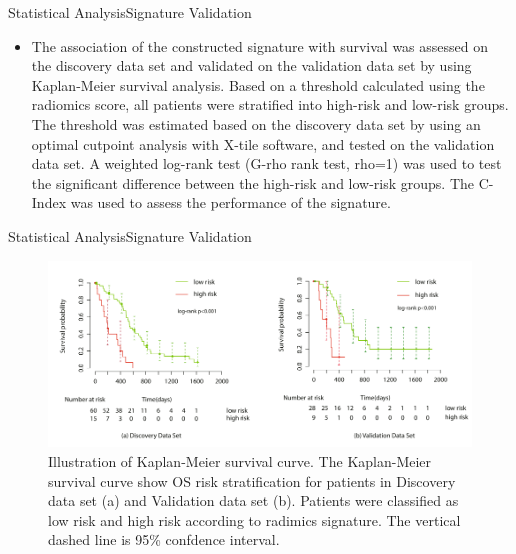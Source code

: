 \documentclass[
]{beamer}
\begin{document}
	\begin{frame}{Statistical Analysis}{Signature Validation}
		\begin{itemize}
			\item The association of the constructed signature with survival was assessed on the discovery
			data set and validated on the validation data set by using Kaplan-Meier survival analysis. Based on a threshold
			calculated using the radiomics score, all patients were stratified into high-risk and low-risk groups. The threshold
			was estimated based on the discovery data set by using an optimal cutpoint analysis with X-tile software, and
			tested on the validation data set. A weighted log-rank test (G-rho rank test, rho=1) was used to test the significant
			difference between the high-risk and low-risk groups. The C-Index was used to assess the performance of
			the signature.
		\end{itemize}
	\end{frame}
	
	\begin{frame}{Statistical Analysis}{Signature Validation}
		\begin{figure}
			\includegraphics[scale=0.45]{km1}
			\caption{Illustration of Kaplan-Meier survival curve. The Kaplan-Meier survival curve show OS risk
				stratification for patients in Discovery data set (a) and Validation data set (b). Patients were classified as low risk
				and high risk according to radimics signature. The vertical dashed line is 95\% confdence interval.}
		\end{figure}
	\end{frame}
	
\end{document}
